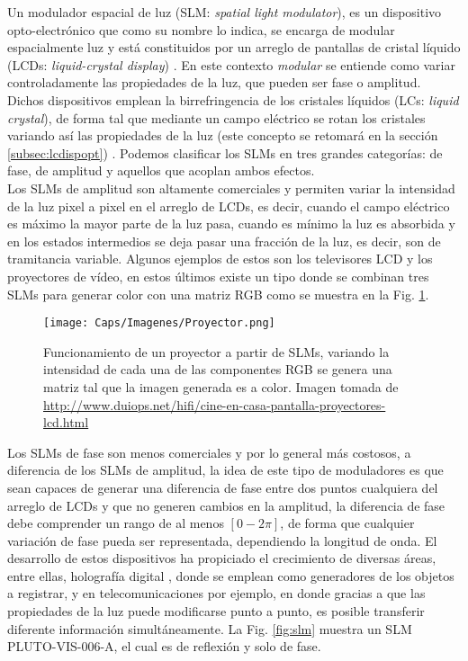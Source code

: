 Un modulador espacial de luz (SLM: \textit{spatial light modulator}), es un dispositivo opto-electrónico que como su nombre lo indica, se encarga de modular espacialmente luz y está constituidos por un arreglo de pantallas de cristal líquido (LCDs: \textit{liquid-crystal display}) \cite{Burman2010}. En este contexto \textit{modular} se entiende como variar controladamente las propiedades de la luz, que pueden ser fase o amplitud. Dichos dispositivos emplean la birrefringencia de los cristales líquidos (LCs: \textit{liquid crystal}), de forma tal que mediante un campo eléctrico se rotan los cristales variando así las propiedades de la luz (este concepto se retomará en la sección \ref{subsec:lcdispopt}) \cite{Gennes2007, Cho1998}. Podemos clasificar los SLMs en tres grandes categorías: de fase, de amplitud y aquellos que acoplan ambos efectos. \\

Los SLMs de amplitud son altamente comerciales y permiten variar la intensidad de la luz pixel a pixel en el arreglo de LCDs, es decir, cuando el campo eléctrico es máximo la mayor parte de la luz pasa, cuando es mínimo la luz es absorbida y en los estados intermedios se deja pasar una fracción de la luz, es decir, son de tramitancia variable. Algunos ejemplos de estos son los televisores LCD y los proyectores de vídeo, en estos últimos existe un tipo donde se combinan tres SLMs para generar color con una matriz RGB como se muestra en la Fig. \ref{fig:proyector}.\\

\begin{figure}[!ht]
  \centering
    \texttt{[image: Caps/Imagenes/Proyector.png]}
  \caption[Funcionamiento de un proyector a partir de SLMs.]{Funcionamiento de un proyector a partir de SLMs, variando la intensidad de cada una de las componentes RGB se genera una matriz tal que la imagen generada es a color. Imagen tomada de \small \url{http://www.duiops.net/hifi/cine-en-casa-pantalla-proyectores-lcd.html}}
  \label{fig:proyector}
\end{figure}

Los SLMs de fase son menos comerciales y por lo general más costosos, a diferencia de los SLMs de amplitud, la idea de este tipo de moduladores es que sean capaces de generar una diferencia de fase entre dos puntos cualquiera del arreglo de LCDs y que no generen cambios en la amplitud, la diferencia de fase debe comprender un rango de al menos $[0 - 2\pi]$, de forma que cualquier variación de fase pueda ser representada, dependiendo la longitud de onda. El desarrollo de estos dispositivos ha propiciado el crecimiento de diversas áreas, entre ellas, holografía digital \cite{Jesacher2008}, donde se emplean como generadores de los objetos a registrar,  y en telecomunicaciones \cite{Ahderom2002} por ejemplo, en donde gracias a que las propiedades de la luz puede modificarse punto a punto, es posible transferir diferente información simultáneamente. La Fig. \ref{fig:slm} muestra un SLM PLUTO-VIS-006-A, el cual es de reflexión y solo de fase. \\

